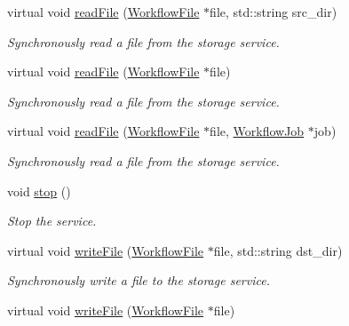 \begin{DoxyCompactItemize}
virtual void \hyperlink{classwrench_1_1_storage_service_a3a727ec680b1035a1e46fbddbbfe08bd}{read\+File} (\hyperlink{classwrench_1_1_workflow_file}{Workflow\+File} $\ast$file, std\+::string src\+\_\+dir)
\begin{DoxyCompactList}\small\item\em Synchronously read a file from the storage service. \end{DoxyCompactList}\item 
virtual void \hyperlink{classwrench_1_1_storage_service_a42b42928c2d7c1a878453013ea1fb8c3}{read\+File} (\hyperlink{classwrench_1_1_workflow_file}{Workflow\+File} $\ast$file)
\begin{DoxyCompactList}\small\item\em Synchronously read a file from the storage service. \end{DoxyCompactList}\item 
virtual void \hyperlink{classwrench_1_1_storage_service_aa5cc9e820500ba55628a2e603fa7e3a8}{read\+File} (\hyperlink{classwrench_1_1_workflow_file}{Workflow\+File} $\ast$file, \hyperlink{classwrench_1_1_workflow_job}{Workflow\+Job} $\ast$job)
\begin{DoxyCompactList}\small\item\em Synchronously read a file from the storage service. \end{DoxyCompactList}\item 
\mbox{\label{classwrench_1_1_storage_service_a1267ad1722291f56532c283658f31acc}} 
void \hyperlink{classwrench_1_1_storage_service_a1267ad1722291f56532c283658f31acc}{stop} ()
\begin{DoxyCompactList}\small\item\em Stop the service. \end{DoxyCompactList}\item 
virtual void \hyperlink{classwrench_1_1_storage_service_a08557ca59c1957548a2b66e518cf174a}{write\+File} (\hyperlink{classwrench_1_1_workflow_file}{Workflow\+File} $\ast$file, std\+::string dst\+\_\+dir)
\begin{DoxyCompactList}\small\item\em Synchronously write a file to the storage service. \end{DoxyCompactList}\item 
virtual void \hyperlink{classwrench_1_1_storage_service_a4c157981db2f6408f0de2a2f624c3f85}{write\+File} (\hyperlink{classwrench_1_1_workflow_file}{Workflow\+File} $\ast$file)

\end{DoxyCompactItemize}
